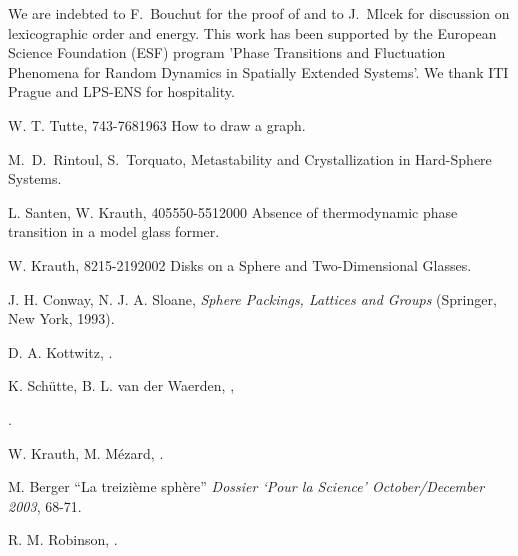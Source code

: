 \documentclass[invmat]{svjour}
\begin{document}
\begin{acknowledgement}
We are indebted to F.~Bouchut for the proof of
  and to \mbox{J.~Mlcek} for discussion on
lexicographic order and energy.  This work has been supported by
the European Science Foundation (ESF) program 'Phase Transitions and
Fluctuation Phenomena for Random Dynamics in Spatially Extended Systems'.
We thank ITI Prague and LPS-ENS for hospitality.

\end{acknowledgement}
\begin{thebibliography}{}
W. T. Tutte,
 {743-768}{1963}
{How to draw a graph}.

M.~D.~Rintoul, S.~Torquato,
{Metastability and Crystallization in Hard-Sphere Systems}.

 L. Santen, W. Krauth,
 {405}{550-551}{2000}
{Absence of thermodynamic phase transition in a model glass former}.

W. Krauth,
 {8}{215-219}{2002}
{Disks on a Sphere and Two-Dimensional Glasses}.

 J. H. Conway, N. J. A. Sloane, {\sl Sphere Packings,
Lattices and Groups} (Springer, New York, 1993).

 D. A. Kottwitz,
.

 K. Sch\"{u}tte, B. L. van der Waerden,
,

.

 W. Krauth, M. M\'{e}zard,
.

 M. Berger ``La treizi\`{e}me sph\`{e}re''
{\sl Dossier `Pour la Science' October/December 2003}, 68-71.

 R. M. Robinson,
.

\end{thebibliography}
\end{document}
